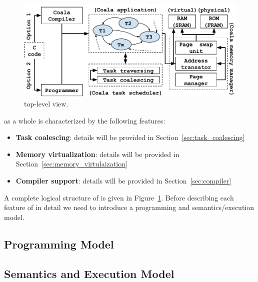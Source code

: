 \begin{figure}
	\centering
	\includegraphics[width=\columnwidth]{figures/viper_block_diagram}
	\caption{\sys top-level view.}
	\label{fig:system_overview}
\end{figure}

\sys as a whole is characterized by the following features:

\begin{itemize}
	\item \textbf{Task coalescing}: details will be provided in Section~\ref{sec:task_coalescing}
	\item \textbf{Memory virtualization}: details will be provided in Section~\ref{sec:memory_virtulaization}
	\item \textbf{Compiler support}: details will be provided in Section~\ref{sec:compiler}
\end{itemize}

A complete logical structure of \sys is given in Figure~\ref{fig:system_overview}. Before describing each feature of \sys in detail we need to introduce a programming and semantics/execution model.

\subsection{Programming Model}
\label{sec:overview_programming_model}



\subsection{Semantics and Execution Model}
\label{sec:overview_semantics}

